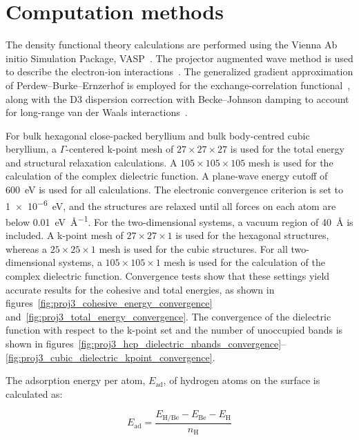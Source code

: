 \section{Computation methods}
\label{3_methods}

The density functional theory calculations are performed using the Vienna Ab initio Simulation Package,
VASP~\cite{kresse1993ab,kresse1994ab,kresse1996efficiency,kresse1996efficient}.
The projector augmented wave method is used to describe the electron-ion interactions~\cite{kresse1999ultrasoft}.
The generalized gradient approximation of Perdew--Burke--Ernzerhof is employed for the exchange-correlation functional~\cite{perdew1996generalized},
along with the D3 dispersion correction with Becke--Johnson damping to account for long-range van der Waals interactions~\cite{becke2005density,grimme2010consistent,grimme2011effect}.

For bulk hexagonal close-packed beryllium and bulk body-centred cubic beryllium,
a $\Gamma$-centered k-point mesh of $27 \times 27 \times 27$ is used for the total energy and structural relaxation calculations.
A $105 \times 105 \times 105$ mesh is used for the calculation of the complex dielectric function.
A plane-wave energy cutoff of \qty{600}{\electronvolt} is used for all calculations.
The electronic convergence criterion is set to \qty{1e-6}{\electronvolt},
and the structures are relaxed until all forces on each atom are below \qty{0.01}{\electronvolt\per\angstrom}.
For the two-dimensional systems,
a vacuum region of \qty{40}{\angstrom} is included.
A k-point mesh of $27 \times 27 \times 1$ is used for the hexagonal structures,
whereas a $25 \times 25 \times 1$ mesh is used for the cubic structures.
For all two-dimensional systems,
a $105 \times 105 \times 1$ mesh is used for the calculation of the complex dielectric function.
Convergence tests show that these settings yield accurate results for the cohesive and total energies,
as shown in figures~\ref{fig:proj3_cohesive_energy_convergence} and~\ref{fig:proj3_total_energy_convergence}.
The convergence of the dielectric function with respect to the k-point set and the number of unoccupied bands is shown in figures~\ref{fig:proj3_hcp_dielectric_nbands_convergence}--\ref{fig:proj3_cubic_dielectric_kpoint_convergence}.

The adsorption energy per atom, $E_{\mathrm{ad}}$, of hydrogen atoms on the surface is calculated as:

\begin{equation}
    E_{\mathrm{ad}} =
    \frac{E_{\mathrm{H/Be}} - E_{\mathrm{Be}} - E_{\mathrm{H}}}{n_{\mathrm{H}}}
\label{hydrogen_adsorption_energy_beryllene}
\end{equation}

